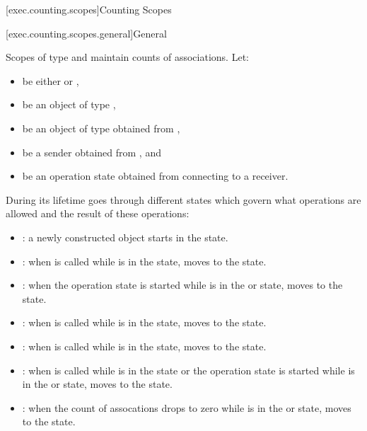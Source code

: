 [exec.counting.scopes]{Counting Scopes}

[exec.counting.scopes.general]{General}

\pnum
Scopes of type  and 
maintain counts of associations.
Let:
\begin{itemize}
\item
{} be either  or ,
\item
{} be an object of type ,
\item
{} be an object of type 
obtained from ,
\item
{} be a sender obtained from , and
\item
{} be an operation state obtained from
connecting  to a receiver.
\end{itemize}
During its lifetime  goes through different states
which govern what operations are allowed and the result of these operations:

\begin{itemize}
\item
{}:
a newly constructed object starts in the  state.

\item
{}:
when  is called
while  is in the  state,
 moves to the  state.

\item
{}:
when the operation state  is started
while  is in the  or  state,
 moves to the  state.

\item
{}:
when  is called
while  is in the  state,
 moves to the  state.

\item
{}:
when  is called
while  is in the  state,
 moves to the  state.

\item
{}:
when  is called
while  is in the  state or
the operation state  is started
while  is in
the  or  state,
 moves to the  state.

\item
{}:
when the count of assocations drops to zero
while  is in
the  or  state,
 moves to the  state.
\end{itemize}

